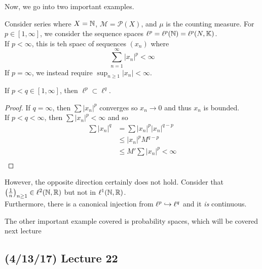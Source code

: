 \documentclass[11pt,leqno,oneside]{amsbook}
\numberwithin{thm}{section}
\renewcommand{\P}{\mathcal{P}} %
\newcommand{\M}{\mathcal{M}} %
\newcommand{\K}{\mathbb{K}} %
\begin{document}
Now, we go into two important examples.
\begin{example}
  Consider series where \(X = {\mathbb N}\), \(\M = \P(X)\), and \(\mu\) is the
  counting measure. For \(p \in [1,\infty]\), we consider the sequence
  spaces \(\ell^p = \ell^p(\N) = \ell^p(N,\K)\). \\
  If \(p < \infty\), this is teh spaec of sequences \((x_n)\) where \[
    \sum_{n=1}^\infty |x_n|^p < \infty
  \]
  If \(p = \infty\), we instead require \(\sup_{n \geq 1} |x_n| <
  \infty\).
\end{example}
\begin{thm}
  If \(p < q \in [1,\infty]\), then \(\ell^p \subset \ell^q\).
\end{thm}
\begin{proof}
  If \(q = \infty\), then \(\sum |x_n|^p\) converges so \(x_n \to 0\)
  and thus \(x_n\) is bounded.\\

  If \(p < q < \infty\), then \(\sum |x_n|^p < \infty\) and so
  \begin{align*}
    \sum |x_n|^q & = \sum |x_n|^p |x_n|^{q-p} \\
                 & \leq |x_n|^p M^{q-p} \\
                 & \leq M' \sum |x_n|^p < \infty \\
  \end{align*}
\end{proof}
  However, the opposite direction certainly does not hold. Consider
  that \(\left( \frac{1}{n} \right)_{n \geq 1} \in \ell^2({\mathbb N},{\mathbb R})\) but
  not in \(\ell^1({\mathbb N},{\mathbb R})\). \\

  Furthermore, there is a canonical injection from \(\ell^p \hookrightarrow
  \ell^q\) and it \emph{is} continuous.
  \begin{example}
    The other important example covered is probability spaces, which
    will be covered next lecture
  \end{example}
  \subsection*{(4/13/17) Lecture 22}
\end{document}
